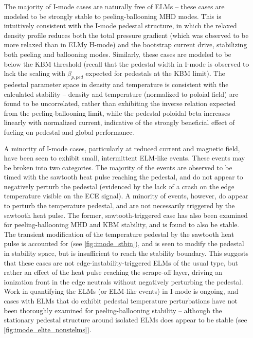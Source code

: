 The majority of I-mode cases are naturally free of ELMs -- these cases are modeled to be strongly stable to peeling-ballooning MHD modes.  This is intuitively consistent with the I-mode pedestal structure, in which the relaxed density profile reduces both the total pressure gradient (which was observed to be more relaxed than in ELMy H-mode) and the bootstrap current drive, stabilizing both peeling and ballooning modes.  Similarly, these cases are modeled to be below the KBM threshold (recall that the pedestal width in I-mode is observed to lack the scaling with $\beta_{p,ped}$ expected for pedestals at the KBM limit).  The pedestal parameter space in density and temperature is consistent with the calculated stability -- density and temperature (normalized to poloial field) are found to be uncorrelated, rather than exhibiting the inverse relation expected from the peeling-ballooning limit, while the pedestal poloidal beta increases linearly with normalized current, indicative of the strongly beneficial effect of fueling on pedestal and global performance.

A minority of I-mode cases, particularly at reduced current and magnetic field, have been seen to exhibit small, intermittent ELM-like events.  These events may be broken into two categories.  The majority of the events are observed to be timed with the sawtooth heat pulse reaching the pedestal, and do not appear to negatively perturb the pedestal (evidenced by the lack of a crash on the edge temperature visible on the ECE signal).  A minority of events, however, do appear to perturb the temperature pedestal, and are not necessarily triggered by the sawtooth heat pulse.  The former, sawtooth-triggered case has also been examined for peeling-ballooning MHD and KBM stability, and is found to also be stable.  The transient modification of the temperature pedestal by the sawtooth heat pulse is accounted for (see \cref{fig:imode_stbin}), and is seen to modify the pedestal in stability space, but is insufficient to reach the stability boundary.  This suggests that these cases are not edge-instability-triggered ELMs of the usual type, but rather an effect of the heat pulse reaching the scrape-off layer, driving an ionization front in the edge neutrals without negatively perturbing the pedestal.  Work in quantifying the ELMs (or ELM-like events) in I-mode is ongoing, and cases with ELMs that do exhibit pedestal temperature perturbations have not been thoroughly examined for peeling-ballooning stability -- although the stationary pedestal structure around isolated ELMs does appear to be stable (see \cref{fig:imode_elite_nonstelms}).\nicesectionending

